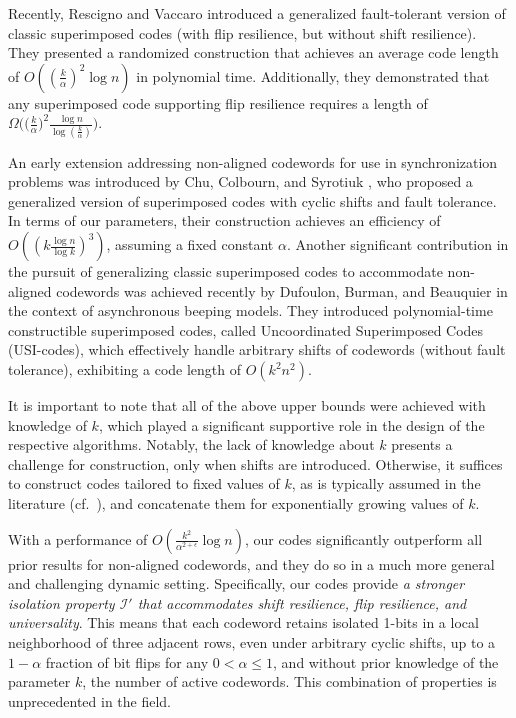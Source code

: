 \documentclass[11pt]{article}
\begin{document}
Recently, Rescigno and Vaccaro \cite{RV2024} introduced a generalized fault-tolerant version of 
classic superimposed codes ({with flip resilience, but without shift resilience}). 
They presented a randomized construction that achieves an 
average code length of $O((\frac{k}{\alpha})^2 \log n)$ in polynomial time.
Additionally, they demonstrated that 
any superimposed code supporting flip resilience requires a length of $\Omega\Big(\Big(\frac{k}
{\alpha}\Big)^2 \frac{\log n}{\log (\frac{k}{\alpha})}\Big)$.

An early extension addressing non-aligned codewords for use in synchronization problems was introduced by 
Chu, Colbourn, and Syrotiuk \cite{CCSb2006,CCSa2006}, who proposed a generalized version of 
superimposed codes with cyclic shifts and fault tolerance. In terms of our parameters, their construction 
achieves an efficiency of $O((k \frac{\log n}{\log k})^3)$, assuming a fixed constant 
$\alpha$. Another significant contribution in the pursuit of generalizing classic superimposed codes to 
accommodate non-aligned codewords was achieved recently by Dufoulon, Burman, and Beauquier \cite{DBB2020} 
in the context of asynchronous beeping models. They introduced polynomial-time constructible superimposed 
codes, called Uncoordinated Superimposed Codes (USI-codes), which effectively handle arbitrary shifts 
of codewords (without fault tolerance), exhibiting a code length of $O(k^2 n^2)$.

It is important to note that all of the above upper bounds were achieved with knowledge of $k$, which 
played a significant supportive role in the design of the respective algorithms. Notably, the lack of 
knowledge about $k$ presents a challenge for construction, only when shifts are introduced. 
Otherwise, it suffices to construct codes tailored to fixed values of $k$, as is typically assumed 
in the literature (cf.~\cite{PR11}), and concatenate them for exponentially growing values of $k$.

With a performance of $O\left(\frac{k^2}{\alpha^{2+\epsilon}} \log n\right)$, our codes significantly 
outperform all prior results for non-aligned codewords, and they do so in a much more general and 
challenging dynamic setting. 
{Specifically, our codes provide 
\textit{a stronger isolation property ${\mathcal I'}$ that accommodates shift resilience, 
flip resilience, and universality}. This means that each codeword retains isolated 1-bits in a local 
neighborhood of three adjacent rows, even under arbitrary cyclic shifts, up to a $1-\alpha$ fraction 
of bit flips for any 
 $0 < \alpha \le 1$, and without prior knowledge of the parameter $k$, the number of active codewords. 
This combination of properties is unprecedented in the field.
}
\end{document}
